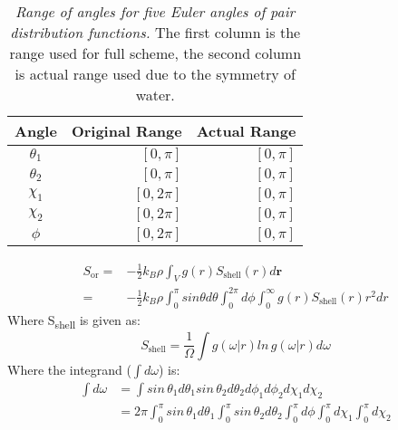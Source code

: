 \documentclass[12pt]{article}
\begin{document}
\begin{table}[ht!]
\centering
\begin{tabular}{|c|r|r|}
\hline
\textbf{Angle} & \multicolumn{1}{c|}{\textbf{Original Range}} & \multicolumn{1}{c|}{\textbf{Actual Range}} \\ \hline
\( \theta_1\) & \([0, \pi]\)                             & \([0, \pi]\)                           \\ \hline
\( \theta_2\) & \([0, \pi]\)                             & \([0, \pi]\)                           \\ \hline
\( \chi_1\)   & \([0, 2\pi]\)                            & \([0, \pi]\)                           \\ \hline
\( \chi_2\)   & \([0, 2\pi]\)                            & \([0, \pi]\)                           \\ \hline
\( \phi\)      & \([0, 2\pi]\)                            & \([0, \pi]\)                           \\ \hline
\end{tabular}
\caption{\textit{Range of angles for five Euler angles of pair distribution functions.} The first column is the range used for full scheme, the second column is actual range used due to the symmetry of water.}
\label{table:ent_angles}
\end{table}
\begin{equation}
 \begin{split}
    S_{\text{or}} = & - \frac{1}{2} k_B \rho \int_V g(r) S_{\text{shell}} (r) d \textbf{r} \\
                        = & - \frac{1}{2} k_B \rho \int_0^\pi sin \theta d \theta \int_0^{2\pi} d \phi \int_0^\infty g(r) S_{\text{shell}} (r) r^2 dr
\end{split}
\end{equation}
Where S\textsubscript{shell} is given as:
\begin{equation}
    S_{\text{shell}} = \frac{1}{\Omega} \int g(\omega | r) ln \, g(\omega | r) d\omega
\end{equation}
Where the integrand (\( \int d\omega\)) is:
\begin{equation}
 \begin{split}
    \int d\omega & = \int sin \, \theta_1 d \theta_1 sin \, \theta_2 d \theta_2 d\phi_1 d\phi_2 d\chi_1 d\chi_2 \\
        & =  2\pi \int_0^\pi sin \, \theta_1 d \theta_1 \int_0^\pi sin \, \theta_2 d \theta_2 \int_0^\pi d\phi\int_0^\pi d\chi_1 \int_0^\pi d\chi_2 
 \end{split}
\end{equation}
\end{document}
